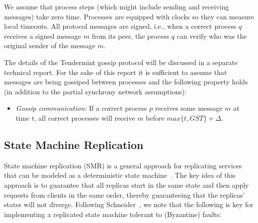 We assume that process steps (which might include sending and receiving messages) take zero time.
Processes are equipped with clocks so they can measure local timeouts.
All protocol messages are signed, i.e., when a correct process $q$ receives a signed message $m$ from its peer, the process $q$ can verify who was the original sender of the message $m$.

The details of the Tendermint gossip protocol will be discussed in a separate technical report. For the sake of this report it is sufficient to assume that messages are being gossiped between processes and the following property holds (in addition to the partial synchrony network assumptions):

\begin{itemize}
	\item \emph{Gossip communication:} If a correct process $p$ receives some message $m$ at time $t$, all correct processes will receive $m$ before $max\{t, GST\} + \Delta$.    
\end{itemize}




\subsection{State Machine Replication}

State machine replication (SMR) is a general approach for replicating
services that can be modeled as a deterministic state
machine~\cite{Lam78:cacm,Sch90:survey}.
The key idea of this approach is to guarantee that all replicas start
in the same state and then apply requests from clients in the
same order, thereby guaranteeing that the replicas' states will
not diverge.
Following Schneider~\cite{Sch90:survey}, we note that the following is key for
implementing a replicated state machine tolerant to (Byzantine) faults:

